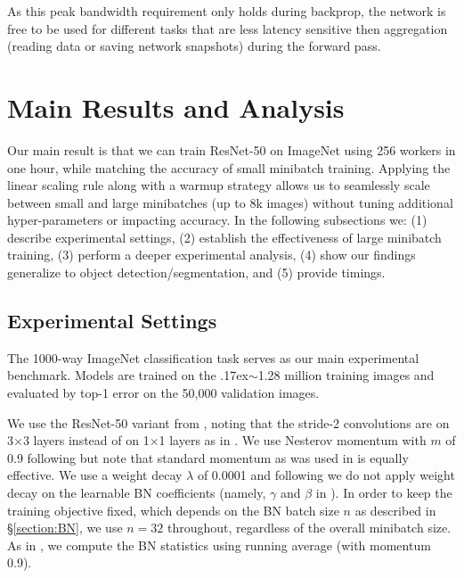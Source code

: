 \documentclass[10pt,twocolumn,letterpaper]{article}
\def\x{\times}
\newcommand{\app}{\raise.17ex\hbox{$\scriptstyle\sim$}}
\begin{document}
As this peak bandwidth requirement only holds during backprop, the network is free to be used for different tasks that are less latency sensitive then aggregation (\eg reading data or saving network snapshots) during the forward pass.

\section{Main Results and Analysis}\label{sec:exp}

Our main result is that we can train ResNet-50 \cite{He2016} on ImageNet \cite{Russakovsky2015} using 256 workers in one hour, while matching the accuracy of small minibatch training. Applying the linear scaling rule along with a warmup strategy allows us to seamlessly scale between small and large minibatches (up to 8k images) without tuning additional hyper-parameters or impacting accuracy. In the following subsections we: (1) describe experimental settings, (2) establish the effectiveness of large minibatch training, (3) perform a deeper experimental analysis, (4) show our findings generalize to object detection/segmentation, and (5) provide timings.

\subsection{Experimental Settings}\label{sec:exp:settings}

The 1000-way ImageNet classification task \cite{Russakovsky2015} serves as our main experimental benchmark. Models are trained on the \app1.28 million training images and evaluated by top-1 error on the 50,000 validation images.

We use the ResNet-50 \cite{He2016} variant from \cite{Gross2016}, noting that the stride-2 convolutions are on 3$\x$3 layers instead of on 1$\x$1 layers as in \cite{He2016}. We use Nesterov momentum \cite{Nesterov2004} with $m$ of 0.9 following \cite{Gross2016} but note that standard momentum as was used in \cite{He2016} is equally effective. We use a weight decay $\lambda$ of 0.0001 and following \cite{He2016} we do not apply weight decay on the learnable BN coefficients (namely, $\gamma$ and $\beta$ in \cite{Ioffe2015}). In order to keep the training objective fixed, which depends on the BN batch size $n$ as described in \S\ref{section:BN}, we use $n = 32$ throughout, regardless of the overall minibatch size. As in \cite{Gross2016}, we compute the BN statistics using running average (with momentum 0.9).
\end{document}
